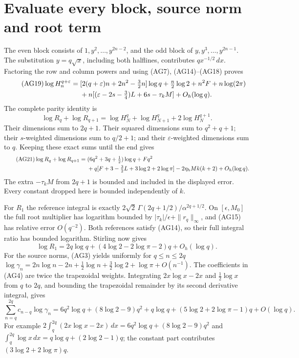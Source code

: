 \documentclass[11pt]{article}
\newcommand{\dd}{\,d}\newcommand{\Gram}{\operatorname{Gram}}
\begin{document}
\section{Evaluate every block, source norm and root term}
The even block consists of $1,y^2,\ldots,y^{2n-2}$, and the odd block of
$y,y^3,\ldots,y^{2n-1}$. The substitution $y=q\sqrt x$, including both
halflines, contributes $q x^{-1/2}\dd x$.
Factoring the row and column powers and using (AG7), (AG14)--(AG18) proves
\begin{align}\tag{AG19}
 \log H_n^{q+\varepsilon}
 ={}&[2(q+\varepsilon)n+2n^2-\tfrac32n]\log q
       +\tfrac n2\log2+n^2F+n\log(2\pi)\\
 &+n[(\varepsilon-2s-\tfrac34)L+6s-\tau_kM]
       +O_h(\log q).\notag
\end{align}
The complete parity identity is
\begin{equation}\tag{AG20}
 \log R_q+\log R_{q+1}
 =\log H_N^q+\log H_{N+1}^q+2\log H_N^{q+1}.
\end{equation}
Their dimensions sum to $2q+1$. Their squared dimensions sum to
$q^2+q+1$; their $s$-weighted dimensions sum to $q/2+1$;
and their $\varepsilon$-weighted dimensions sum to $q$.
Keeping these exact sums until the end gives
\begin{align}\tag{AG21}
 \log R_q+\log R_{q+1}
 ={}&(6q^2+3q+\tfrac12)\log q+Fq^2\\
 &+q[F+3-\tfrac32L+3\log2+2\log\pi]
       -2\eta_h M k(k+2)+O_h(\log q).\notag
\end{align}
The extra $-\tau_kM$ from $2q+1$ is bounded and included in the displayed
error. Every constant dropped here is bounded independently of $k$.

For $R_1$ the reference integral is exactly
$2\sqrt2\,\Gamma(2q+1/2)/\alpha^{2q+1/2}$.
On $[\epsilon,M_0]$ the full root multiplier has logarithm bounded by
$|\tau_k|/\epsilon+\|r_q\|_\infty$, and (AG15) has relative error $O(q^{-2})$.
Both references satisfy (AG14), so their full integral ratio has bounded
logarithm. Stirling now gives
\begin{equation}\tag{AG22}
 \log R_1=2q\log q+(4\log2-2\log\pi-2)q+O_h(\log q).
\end{equation}
For the source norms, (AG3) yields uniformly for $q\le n\le2q$
$\log\gamma_n=2n\log n-2n+\tfrac12\log n+\tfrac32\log2+\log\pi+O(n^{-1})$.
The coefficients in (AG4) are twice the trapezoidal weights. Integrating
$2x\log x-2x$ and $\tfrac12\log x$ from $q$ to $2q$, and bounding the
trapezoidal remainder by its second derivative integral, gives
\begin{equation}\tag{AG23}
 \sum_{n=q}^{2q}c_{n-q}\log\gamma_n
 =6q^2\log q+(8\log2-9)q^2
  +q\log q+(5\log2+2\log\pi-1)q+O(\log q).
\end{equation}
For example $2\int_q^{2q}(2x\log x-2x)\dd x
=6q^2\log q+(8\log2-9)q^2$ and
$\int_q^{2q}\log x\dd x=q\log q+(2\log2-1)q$;
the constant part contributes $(3\log2+2\log\pi)q$.
\end{document}
